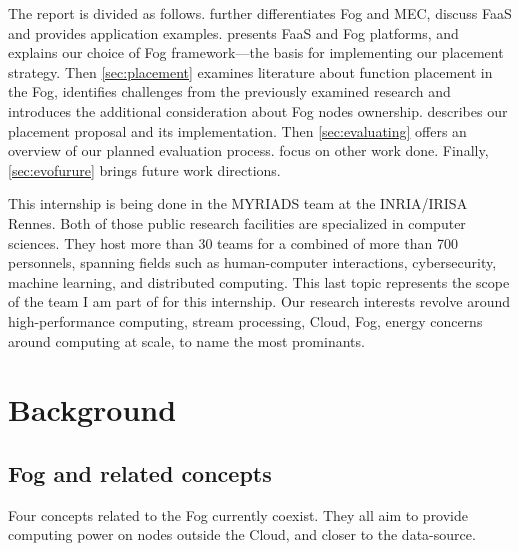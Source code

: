 The report is divided as follows.  further differentiates Fog and \gls{MEC}, discuss \gls{FaaS} and provides application examples.  presents \gls{FaaS} and Fog platforms, and explains our choice of Fog framework—the basis for implementing our placement strategy. Then \cref{sec:placement} examines literature about function placement in the Fog, identifies challenges from the previously examined research and introduces the additional consideration about Fog nodes ownership.  describes our placement proposal and its implementation. Then \cref{sec:evaluating} offers an overview of our planned evaluation process.  focus on other work done. Finally, \cref{sec:evofurure} brings future work directions.

\varthreestars{}

This internship is being done in the MYRIADS team at the INRIA/IRISA Rennes. Both of those public research facilities are specialized in computer sciences. They host more than 30 teams for a combined of more than 700 personnels, spanning fields such as human-computer interactions, cybersecurity, machine learning, and distributed computing. This last topic represents the scope of the team I am part of for this internship. Our research interests revolve around high-performance computing, stream processing, Cloud, Fog, energy concerns around computing at scale, to name the most prominants.

\section{Background}
\label{sec:background}

\subsection{Fog and related concepts}

Four concepts related to the Fog currently coexist. They all aim to provide computing power on nodes outside the Cloud, and closer to the data-source.

